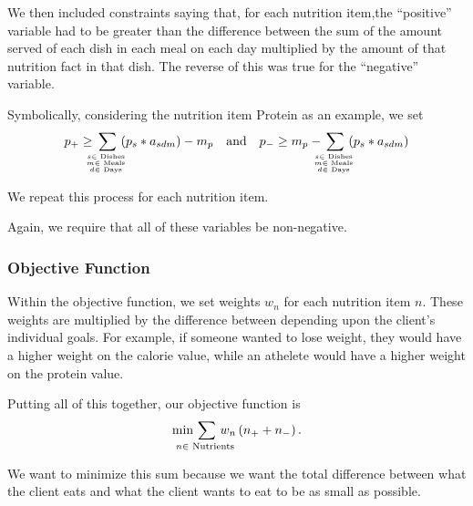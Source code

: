 \documentclass[twoside]{article}
\begin{document}
We then included constraints saying that, for each nutrition item,the ``positive'' variable had to be greater than the difference between the sum of the amount served of each dish in each meal on each day multiplied by the amount of that nutrition fact in that dish. The reverse of this was true for the ``negative'' variable.

Symbolically, considering the nutrition item Protein as an example, we set
\begin{equation*}
    p_+ \geq \thinspace\smashoperator{\sum_{s \in \text{ Dishes } \atop {m \in \text{ Meals } \atop d \in \text{ Days }}}}\thinspace\del{p_s * a_{sdm}} - m_p \quad \text{and} \quad
    p_- \geq  m_p - \thinspace\smashoperator{\sum_{s \in \text{ Dishes } \atop {m \in \text{ Meals } \atop d \in \text{ Days }}}}\thinspace \del{p_s * a_{sdm}}
\end{equation*}

We repeat this process for each nutrition item.

Again, we require that all of these variables be non-negative.

\subsubsection{Objective Function}
Within the objective function, we set weights $w_n$ for each nutrition item $n$. These weights are multiplied by the difference between depending upon the client's individual goals. For example, if someone wanted to lose weight, they would have a higher weight on the calorie value, while an athelete would have a higher weight on the protein value.

Putting all of this together, our objective function is
\begin{equation*}
    \min\thinspace \smashoperator{\sum_{n \in \text{ Nutrients }}}\thinspace w_n \del{n_+ + n_-}.
\end{equation*}

We want to minimize this sum because we want the total difference between what the client eats and what the client wants to eat to be as small as possible.
\end{document}
